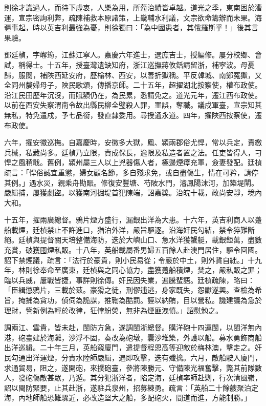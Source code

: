 \begin{pinyinscope}
則徐才識過人，而待下虛衷，人樂為用，所蒞治績皆卓越。道光之季，東南困於漕運，宣宗密詢利弊，疏陳補救本原諸策，上畿輔水利議，文宗欲命籌辦而未果。海疆事起，時以英吉利最強為憂，則徐獨曰：「為中國患者，其俄羅斯乎！」後其言果驗。

鄧廷楨，字嶰筠，江蘇江寧人。嘉慶六年進士，選庶吉士，授編修。屢分校鄉、會試，稱得士。十五年，授臺灣遺缺知府，浙江巡撫蔣攸銛請留浙，補寧波。母憂歸，服闋，補陜西延安府，歷榆林、西安，以善折獄稱。平反韓城、南鄭冤獄，又全同州嫠婦母子，陜民歌頌，傳播京師。二十五年，超擢湖北按察使，權布政使。沿江民田歷年沉沒，而賦額仍在，為民累，悉請免之。道光元年，遷江西布政使。以前在西安失察渭南令故出縣民柳全璧殺人罪，罣誤，奪職。議戍軍臺，宣宗知其無私，特免遣戍，予七品銜，發直隸委用。尋授通永道。四年，擢陜西按察使，遷布政使。

六年，擢安徽巡撫。自嘉慶時，安徽多大獄，鳳、潁兩郡俗尤悍，常以兵定，責繳兵械，私藏尚多。廷楨乃立限，責成保長，逾限及私造者置之法。任吏皆得人，刁悍之風稍戢。舊例，潁州屬三人以上兇器傷人者，極邊煙瘴充軍，僉妻發配。廷楨疏言：「悍俗誠宜重懲，婦女顧名節，多自殘求免，或自盡傷生，情在可矜，請停其例。」遇水災，親乘舟勘賑。修復安豐塘、芍陂水門，濬鳳陽沫河，加築堤閘。嚴緝捕，屢獲劇盜。以獲南河掘堤首犯陳端，詔嘉獎。治皖十載，政尚安靜，境內大和。

十五年，擢兩廣總督。鴉片煙方盛行，漏銀出洋為大患。十六年，英吉利商人以躉船載煙，廷楨禁止不許進口，猶泊外洋，嚴旨驅逐。沿海奸民勾結，禁令猝難斷絕。廷楨與提督關天培整備海防，迭於大嶼山口、急水洋獲蟹艇，載銀鉅萬，盡數充賞，破獲囤煙私販。十八年，英船載屬番男婦五百餘人赴澳門居住，驅令回國。詔下禁煙議，疏言：「法行於豪貴，則小民易從；令嚴於中土，則外貨自絀。」十九年，林則徐奉命至廣東，廷楨與之同心協力，盡獲躉船積煙，焚之，嚴私販之罪；臨以兵威，屢戰皆捷，事詳則徐傳。奸民因失業，遍騰蜚語。廷楨疏陳，略曰：「臣緝懲鴉片，三載於茲。豪猾之徒，刑僇逋逃，身家既失，怨讟遂興。查檢為希旨，掩捕為貪功，偵伺為詭謀，推鞫為酷罰。誣以納賄，目以營私。譏建議為急於理財，訾新例為輕於改律，狂悖紛熒，無非為煙匪洩憤。」詔慰勉之。

調兩江、雲貴，皆未赴，閩防方急，遂調閩浙總督。購洋砲十四運閩，以閩洋無內港，砲臺建於海灘，沙浮不固，奏改為砲墩，囊沙堆築，外護以船。募水勇飾商船出洋巡緝。二十年三月，英船窺廈門，遣提督程恩高等迎敵於梅林澳，擊走之。奸民勾通出洋運煙，分責水陸師嚴緝，遇即攻擊，迭有殲擒。六月，敵船駛入廈門，求通貿易，阻之，遂開砲，來撲砲臺，參將陳勝元、守備陳光福奮擊，斃其前隊數人，發砲傷敵甚眾，乃遁。其分犯浙洋者，陷定海，廷楨率師赴剿，行次清風嶺，詔以閩防緊要，止其赴浙，遂駐兵泉州，招募練勇。疏言：「英船二十餘艘聚泊定海，內地師船恐難驟近，必改造堅大之船，多配砲火，間道而進，方能制勝。」


\end{pinyinscope}
